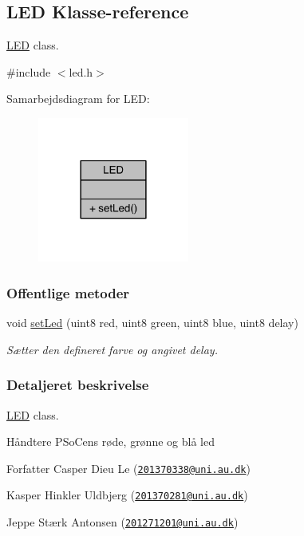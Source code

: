 \hypertarget{class_l_e_d}{}\subsection{L\+ED Klasse-\/reference}
\label{class_l_e_d}


\hyperlink{class_l_e_d}{L\+ED} class.  




{\ttfamily \#include $<$led.\+h$>$}



Samarbejdsdiagram for L\+ED\+:
\nopagebreak
\begin{figure}[H]
\begin{center}
\leavevmode
\includegraphics[width=141pt]{d3/df9/class_l_e_d__coll__graph}
\end{center}
\end{figure}
\subsubsection*{Offentlige metoder}
\begin{DoxyCompactItemize}
\item 
void \hyperlink{class_l_e_d_a1d8e725e3829da99c1d027ba0a2ce57a}{set\+Led} (uint8 red, uint8 green, uint8 blue, uint8 delay)
\begin{DoxyCompactList}\small\item\em Sætter den defineret farve og angivet delay. \end{DoxyCompactList}\end{DoxyCompactItemize}


\subsubsection{Detaljeret beskrivelse}
\hyperlink{class_l_e_d}{L\+ED} class. 

Håndtere P\+SoC\textquotesingle{}ens røde, grønne og blå led \begin{DoxyAuthor}{Forfatter}
Casper Dieu Le (\href{mailto:201370338@uni.au.dk}{\tt 201370338@uni.\+au.\+dk}) 

Kasper Hinkler Uldbjerg (\href{mailto:201370281@uni.au.dk}{\tt 201370281@uni.\+au.\+dk}) 

Jeppe Stærk Antonsen (\href{mailto:201271201@uni.au.dk}{\tt 201271201@uni.\+au.\+dk}) 
\end{DoxyAuthor}


